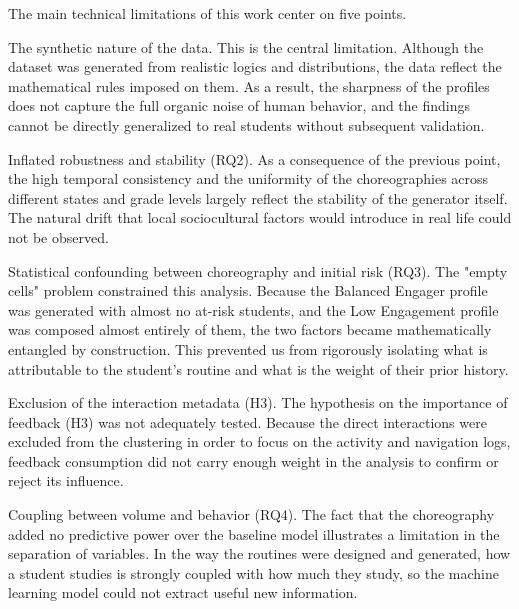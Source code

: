 The main technical limitations of this work center on five points.

The synthetic nature of the data. This is the central limitation. Although the dataset was generated from realistic logics and distributions, the data reflect the mathematical rules imposed on them. As a result, the sharpness of the profiles does not capture the full organic noise of human behavior, and the findings cannot be directly generalized to real students without subsequent validation.

Inflated robustness and stability (RQ2). As a consequence of the previous point, the high temporal consistency and the uniformity of the choreographies across different states and grade levels largely reflect the stability of the generator itself. The natural drift that local sociocultural factors would introduce in real life could not be observed.

Statistical confounding between choreography and initial risk (RQ3). The "empty cells" problem constrained this analysis. Because the Balanced Engager profile was generated with almost no at-risk students, and the Low Engagement profile was composed almost entirely of them, the two factors became mathematically entangled by construction. This prevented us from rigorously isolating what is attributable to the student's routine and what is the weight of their prior history.

Exclusion of the interaction metadata (H3). The hypothesis on the importance of feedback (H3) was not adequately tested. Because the direct interactions were excluded from the clustering in order to focus on the activity and navigation logs, feedback consumption did not carry enough weight in the analysis to confirm or reject its influence.

Coupling between volume and behavior (RQ4). The fact that the choreography added no predictive power over the baseline model illustrates a limitation in the separation of variables. In the way the routines were designed and generated, how a student studies is strongly coupled with how much they study, so the machine learning model could not extract useful new information.

